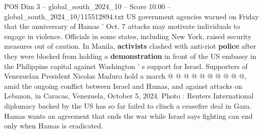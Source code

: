 \begin{textsample}{POS Dim 3 – global\_south\_2024\_10 – Score 10.00 – global\_south\_2024\_10/115512894.txt}
US government agencies warned on Friday that the anniversary of Hamas ' Oct. 7 attacks may motivate individuals to engage in violence.
Officials in some states, including New York, raised security measures out of caution.
In Manila, \textbf{activists} clashed with anti-riot \textbf{police} after they were blocked from holding a \textbf{demonstration} in front of the US embassy in the Philippine capital against Washington ' s support for Israel.
Supporters of Venezuelan President Nicolas Maduro hold a march @ @ @ @ @ @ @ @ @ @, amid the ongoing conflict between Israel and Hamas, and against attacks on Lebanon, in Caracas, Venezuela, October 5, 2024.
Photo : Reuters International diplomacy backed by the US has so far failed to clinch a ceasefire deal in Gaza.
Hamas wants an agreement that ends the war while Israel says fighting can end only when Hamas is eradicated.

\end{textsample}
